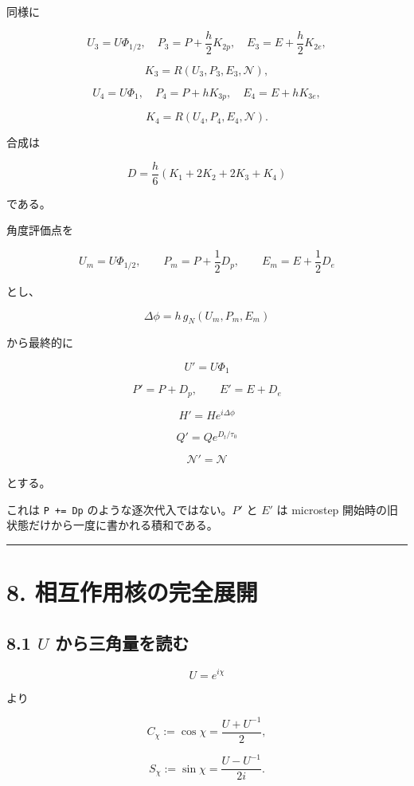 \documentclass[
  a4paper,
]{ltjsarticle}
\begin{document}
同様に

\[
U_3=U\Phi_{1/2},
\quad
P_3=P+\frac h2K_{2p},
\quad
E_3=E+\frac h2K_{2e},
\]

\[
K_3=R(U_3,P_3,E_3,\mathcal N),
\]

\[
U_4=U\Phi_1,
\quad
P_4=P+hK_{3p},
\quad
E_4=E+hK_{3e},
\]

\[
K_4=R(U_4,P_4,E_4,\mathcal N).
\]

合成は

\[
\boxed{
D
=\frac h6
(K_1+2K_2+2K_3+K_4)
}
\]

である。

角度評価点を

\[
U_m=U\Phi_{1/2},
\qquad
P_m=P+\frac12D_p,
\qquad
E_m=E+\frac12D_e
\]

とし、

\[
\Delta\phi=h\,g_N(U_m,P_m,E_m)
\]

から最終的に

\[
\boxed{
U'=U\Phi_1
}
\]

\[
\boxed{
P'=P+D_p,
\qquad
E'=E+D_e
}
\]

\[
\boxed{
H'=He^{i\Delta\phi}
}
\]

\[
\boxed{
Q'=Qe^{D_t/\tau_0}
}
\]

\[
\boxed{
\mathcal N'=\mathcal N
}
\]

とする。

これは \texttt{P\ +=\ Dp} のような逐次代入ではない。\(P'\) と \(E'\) は
microstep 開始時の旧状態だけから一度に書かれる積和である。

\begin{center}\rule{0.5\linewidth}{0.5pt}\end{center}

\section{8.
相互作用核の完全展開}\label{ux76f8ux4e92ux4f5cux7528ux6838ux306eux5b8cux5168ux5c55ux958b}

\subsection{\texorpdfstring{8.1 \(U\)
から三角量を読む}{8.1 U から三角量を読む}}\label{u-ux304bux3089ux4e09ux89d2ux91cfux3092ux8aadux3080}

\[
U=e^{i\chi}
\]

より

\[
C_\chi:=\cos\chi
=\frac{U+U^{-1}}2,
\]

\[
S_\chi:=\sin\chi
=\frac{U-U^{-1}}{2i}.
\]
\end{document}
